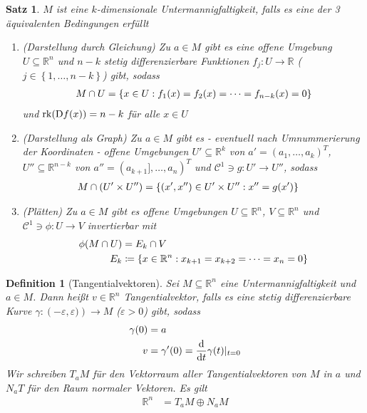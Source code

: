 \documentclass[11pt, twoside, a4paper]{article}
\theoremstyle{plain}
\newtheorem{definition}[blockelement]{Definition}
\newtheorem{satz}[blockelement]{Satz}
\numberwithin{equation}{subsection}
\newcommand{\set}[1]{\left\{#1\right\}}
\newcommand{\pair}[1]{\left(#1\right)}
\newcommand{\of}[1]{\mathopen{}\mathclose{}\bgroup\left(#1\aftergroup\egroup\right)}
\newcommand{\dif}{\mathop{}\!\mathrm{d}}
\DeclareMathOperator{\D}{D\!}
\DeclareMathOperator{\rank}{rk}
\newcommand{\R}{\mathbb{R}}
\newcommand{\mC}{\mathcal{C}}
\begin{document}
    \begin{satz} %
        $M$ ist eine $k$-dimensionale Untermannigfaltigkeit, falls es eine der 3 äquivalenten Bedingungen erfüllt
        \begin{enumerate}[label=(\roman*)]
            \item (Darstellung durch Gleichung) Zu $a\in M$ gibt es eine offene Umgebung $U\subseteq\R^n$ und $n-k$ stetig differenzierbare Funktionen $f_j: U\to\R$ ($j\in\set{1, \ldots, n-k}$) gibt, sodass
            \begin{align*}
                M\cap U = \set{x\in U: f_1\of{x} = f_2\of{x} = \dots = f_{n-k}\of{x} = 0}
            \end{align*}
            und $\rank\of{\D f\of{x}} = n-k$ für alle $x\in U$
            \item (Darstellung als Graph) Zu $a\in M$ gibt es - eventuell nach Umnummerierung der Koordinaten - offene Umgebungen $U'\subseteq\R^k$ von $a' = \pair{a_1, \ldots, a_k}^T$, $U''\subseteq\R^{n-k}$ von $a'' = \pair{a_{k+1}], \ldots, a_n}^{T}$ und $\mC^1\ni g: U'\to U''$, sodass
            \begin{align*}
                M\cap \pair{U'\times U''} &= \set{\pair{x', x''}\in U'\times U'': x'' = g\of{x'}}
            \end{align*}
            \item (Plätten) Zu $a\in M$ gibt es offene Umgebungen $U\subseteq\R^n$, $V\subseteq\R^n$ und $\mC^1\ni\phi: U\to V$ invertierbar mit
            \begin{align*}
                \phi\of{M\cap U} &= E_k \cap V\\
                E_k &\coloneqq \set{x\in\R^n: x_{k+1} = x_{k+2} = \dots = x_n = 0}
            \end{align*}
        \end{enumerate}
    \end{satz}

    \begin{definition}[Tangentialvektoren]
        Sei $M\subseteq\R^n$ eine Untermannigfaltigkeit und $a\in M$. Dann heißt $v\in\R^n$ Tangentialvektor, falls es eine stetig differenzierbare Kurve $\gamma: \pair{-\varepsilon, \varepsilon)} \to M$ ($\varepsilon > 0$) gibt, sodass
        \begin{align*}
            \gamma\of{0} &= a\\
            v &= \gamma'\of{0} = \frac{\dif}{\dif t} \gamma\of{t}\vert_{t=0}
        \end{align*}
        Wir schreiben $T_a M$ für den Vektorraum aller Tangentialvektoren von $M$ in $a$ und $N_{a}T$ für den Raum normaler Vektoren. Es gilt
        \begin{align*}
            \R^n &= T_a M \oplus N_a M
        \end{align*}
    \end{definition}
\end{document}
